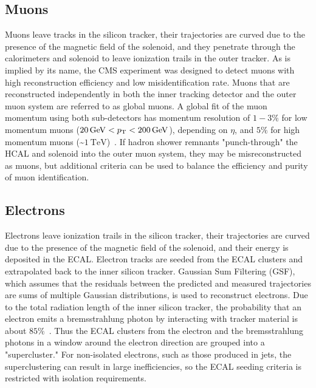 \subsection{Muons}
Muons leave tracks in the silicon tracker, their trajectories are curved due to the presence of the magnetic field of the solenoid, and they penetrate through the calorimeters and solenoid to leave ionization trails in the outer tracker.
As is implied by its name, the CMS experiment was designed to detect muons with high reconstruction efficiency and low misidentification rate.
Muons that are reconstructed independently in both the inner tracking detector and the outer muon system are referred to as global muons.
A global fit of the muon momentum using both sub-detectors has momentum resolution of $1-3\%$ for low momentum muons ($\SI{20}{\GeV} < \pT < \SI{200}{\GeV}$), depending on $\eta$, and $5\%$ for high momentum muons (\sim$\SI{1}{\TeV}$)~\cite{Chatrchyan:1129810}.
If hadron shower remnants "punch-through" the HCAL and solenoid into the outer muon system, they may be misreconstructed as muons, but additional criteria can be used to balance the efficiency and purity of muon identification.

\subsection{Electrons}
Electrons leave ionization trails in the silicon tracker, their trajectories are curved due to the presence of the magnetic field of the solenoid, and their energy is deposited in the ECAL.
Electron tracks are seeded from the ECAL clusters and extrapolated back to the inner silicon tracker.
Gaussian Sum Filtering (GSF), which assumes that the residuals between the predicted and measured trajectories are sums of multiple Gaussian distributions, is used to reconstruct electrons.
Due to the total radiation length of the inner silicon tracker, the probability that an electron emits a bremsstrahlung photon by interacting with tracker material is about $85\%$~\cite{Sirunyan:2270046}.
Thus the ECAL clusters from the electron and the bremsstrahlung photons in a window around the electron direction are grouped into a "supercluster."
For non-isolated electrons, such as those produced in jets, the superclustering can result in large inefficiencies, so the ECAL seeding criteria is restricted with isolation requirements.

